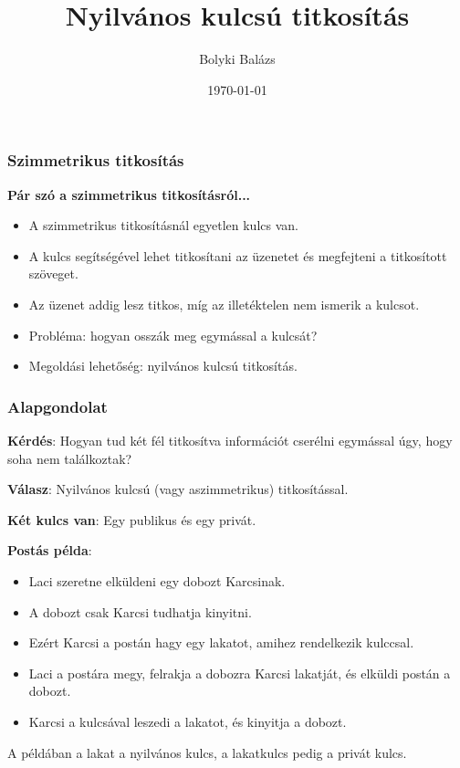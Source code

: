\documentclass{beamer}
\title{Nyilvános kulcsú titkosítás}
\author{Bolyki Balázs}
\institute{Miskolci Egyetem}
\date{\today}
\begin{document}
\titlepage

\begin{frame}
    \frametitle{Szimmetrikus titkosítás}

    \textbf{Pár szó a szimmetrikus titkosításról...}

    \begin{itemize}
        \item A szimmetrikus titkosításnál egyetlen kulcs van.
        \item A kulcs segítségével lehet titkosítani az üzenetet és megfejteni a titkosított szöveget.
        \item Az üzenet addig lesz titkos, míg az illetéktelen nem ismerik a kulcsot.
        \item Probléma: hogyan osszák meg egymással a kulcsát?
        \item Megoldási lehetőség: nyilvános kulcsú titkosítás.
    \end{itemize}
\end{frame}

\begin{frame}
    \frametitle{Alapgondolat}
    \textbf{Kérdés}: Hogyan tud két fél titkosítva információt cserélni egymással úgy, hogy soha nem találkoztak?

    \textbf{Válasz}: Nyilvános kulcsú (vagy aszimmetrikus) titkosítással.

    \textbf{Két kulcs van}: Egy publikus és egy privát.

    \textbf{Postás példa}:

    \begin{itemize}
        \item Laci szeretne elküldeni egy dobozt Karcsinak.
        \item A dobozt csak Karcsi tudhatja kinyitni.
        \item Ezért Karcsi a postán hagy egy lakatot, amihez rendelkezik kulccsal.
        \item Laci a postára megy, felrakja a dobozra Karcsi lakatját, és elküldi postán a dobozt.
        \item Karcsi a kulcsával leszedi a lakatot, és kinyitja a dobozt.
    \end{itemize}

    A példában a lakat a nyilvános kulcs, a lakatkulcs pedig a privát kulcs.

\end{frame}
\end{document}
